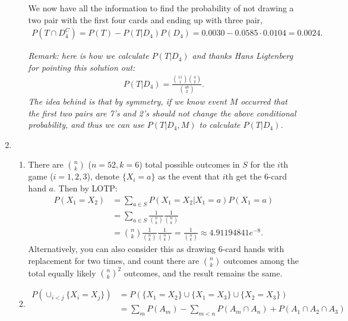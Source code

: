 \begin{exercise}
\begin{solution}
\begin{enumerate}
\begin{enumerate}
			We now have all the information to find the probability of not drawing a two pair with the first four cards and ending up with three pair,
			\begin{align*}
				P(T\cap D_{4}^{C})=P(T)-P(T|D_{4})P(D_{4})=0.0030 - 0.0585\cdot 0.0104 = 0.0024.
			\end{align*}
			
			\textit{Remark: here is how we calculate $P(T|D_{4})$
				and thanks Hans Ligtenberg for pointing this solution out:
				\begin{align*}
					P(T|D_{4}) = \frac{{11\choose 1}{4 \choose 2} }{{48 \choose 2}}.
				\end{align*}
				The idea behind is that by symmetry, if we know event $M$ occurred that the first two pairs are 7's and 2's should not change the above conditional probability, and thus we can use $P(T|D_{4},M)$ to calculate $P(T|D_{4})$.} 
			\end{enumerate}
		\item 
		\begin{enumerate}
			\item 			 There are $n \choose k$ ($n=52, k=6$) total possible outcomes in $S$ for the $i$th game ($i=1,2,3$), denote $\{X_i=a\}$ as the event that $i$th get the 6-card hand $a$. Then by LOTP:
			\begin{align*}
				{P}(X_1=X_2) & = \sum_{a\in S} 	{P}(X_1=X_2|X_1=a) P(X_1=a) \\
				& = \sum_{a\in S} \frac{1}{{n \choose k} }\frac{1}{{n \choose k} } \\
				& = {n \choose k} \frac{1}{{n \choose k} }\frac{1}{{n \choose k} } = \frac{1}{{n \choose k} } \approx 4.91194841e^{-8}.
			\end{align*}
			Alternatively, you can also consider this as drawing 6-card hands with replacement for two times, and count there are $ {n \choose k}$ outcomes among the total equally likely $ {n \choose k}^2$ outcomes, and the result remains the same.
			\item 		\begin{align*}
				P\left(\cup_{i<j} \{X_i=X_j\} \right) & = P\left(\{X_1=X_2\}\cup\{X_1=X_3\} \cup \{X_2=X_3\}  \right) \\
				& = \sum_{m} P(A_m) -\sum_{m<n} P(A_m\cap A_n) + P(A_1\cap A_2\cap A_3) \\

\end{align*}
\end{enumerate}
\end{enumerate}
\end{solution}
\end{exercise}

